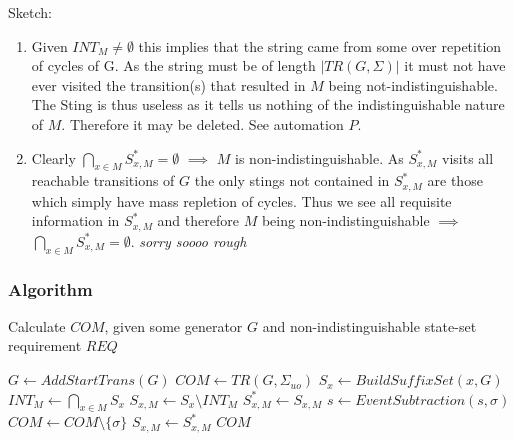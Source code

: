 \documentclass{article}
\begin{document}
				Sketch:

				\begin{enumerate}
					\item Given $INT_M \neq \emptyset$ this implies that the string came from some over repetition of cycles of G. As the string must be of length $|TR(G,\Sigma)|$ it must not have ever visited the transition(s) that resulted in $M$ being not-indistinguishable. The Sting is thus useless as it tells us nothing of the indistinguishable nature of $M$. Therefore it may be deleted. See automation $P$.

					\item Clearly $\bigcap_{x \in M} S_{x,M}^* = \emptyset$ $\implies$ $M$ is non-indistinguishable. As $S_{x,M}^*$ visits all reachable transitions of $G$ the only stings not contained in $S_{x,M}^*$ are those which simply have mass repletion of cycles. Thus we see all requisite information in $S_{x,M}^*$ and therefore $M$ being non-indistinguishable $\implies$ $\bigcap_{x \in M} S_{x,M}^* = \emptyset$.  \emph{sorry soooo rough}
				\end{enumerate} 


			\subsubsection{Algorithm} 

				Calculate $COM$, given some generator $G$ and non-indistinguishable state-set requirement $REQ$
				\begin{algorithmic}[5]
					\STATE $G \leftarrow AddStartTrans(G)$
					\STATE $COM \leftarrow TR(G,\Sigma_{uo})$
								\STATE $S_x \leftarrow BuildSuffixSet(x, G)$
							\ENDIF
						\ENDFOR
						\STATE $INT_M \leftarrow \bigcap_{x \in M} S_x$
							\STATE $S_{x,M} \leftarrow S_x \setminus INT_M$
						\ENDFOR
					\ENDFOR
								\STATE $S_{x,M}^* \leftarrow S_{x,M}$
									\STATE $s \leftarrow EventSubtraction(s, \sigma)$
								\ENDFOR
							\ENDFOR
								\STATE $COM \leftarrow COM \setminus \{\sigma\}$
									\STATE $S_{x,M} \leftarrow S_{x,M}^*$
								\ENDFOR
							\ENDIF
						\ENDFOR
					\ENDFOR
					\RETURN $COM$
				\end{algorithmic}
\end{document}
